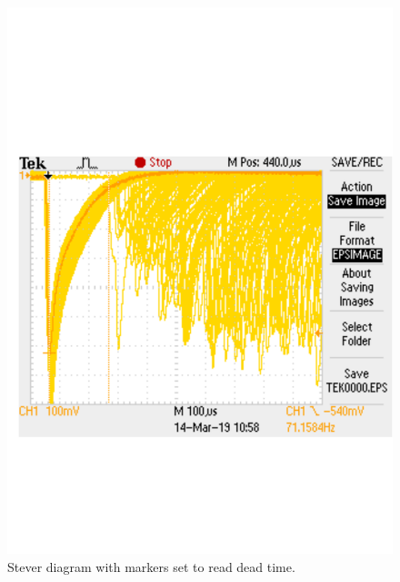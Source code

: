 \begin{figure}[H]
\centering
\includegraphics[width=\textwidth]{../Figures/TEK0000.pdf}
\caption{Stever diagram with markers set to read dead time.}
\label{fig:SteverDead}
\end{figure}

